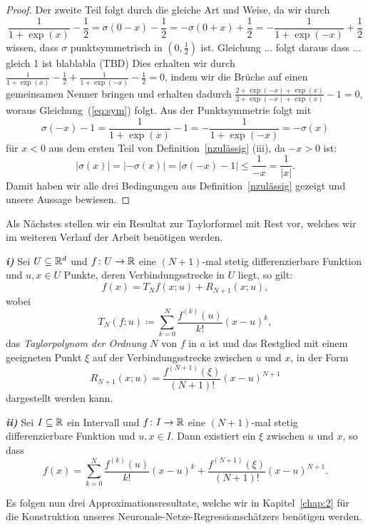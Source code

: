 \begin{proof}
Der zweite Teil folgt durch die gleiche Art und Weise, da wir durch 
\begin{equation}
\label{eq:sym}
\frac{1}{1 + \exp(x)} - \frac{1}{2}= \sigma(0 - x) - \frac{1}{2} = -\sigma(0 + x) + \frac{1}{2} = -\frac{1}{1 + \exp(-x)} + \frac{1}{2}
\end{equation}
wissen, dass $\sigma$ punktsymmetrisch in $(0, \frac{1}{2})$ ist. 
Gleichung ... folgt daraus dass ... gleich 1 ist blablabla (TBD)
Dies erhalten wir durch $\frac{1}{1 + \exp(x)} - \frac{1}{2} +\frac{1}{1 + \exp(-x)} - \frac{1}{2} = 0$, indem wir die Brüche auf einen gemeinsamen Nenner bringen und erhalten dadurch
$\frac{2 + \exp(-x) + \exp(x)}{2 + \exp(-x) + \exp(x)} - 1 = 0$, woraus  Gleichung~(\ref{eq:sym}) folgt.
Aus der Punktsymmetrie folgt mit $$\sigma(- x) - 1 = \frac{1}{1 + \exp(x)} - 1 = -\frac{1}{1 + \exp(-x)} = -\sigma(x)$$ für $x < 0$ aus dem ersten Teil von Definition~\ref{nzulässig} (iii), da $-x > 0 $ ist:  
$$|\sigma(x)| = |-\sigma(x)| = |\sigma(- x) - 1| \leq \frac{1}{-x} = \frac{1}{|x|}.$$
Damit haben wir alle drei Bedingungen aus Definition~\ref{nzulässig} gezeigt und unsere Aussage bewiesen.
\end{proof}
Als Nächstes stellen wir ein Resultat zur Taylorformel mit Rest vor, welches wir im weiteren Verlauf der Arbeit benötigen werden.

\begin{lem}
\label{lem:lagrange}

\textbf{\emph{i)}} Sei $U \subseteq \mathbb{R}^d$ und $f\colon U \to \mathbb{R}$ eine $(N + 1)$-mal stetig differenzierbare Funktion und $u, x \in U$ Punkte, deren Verbindungsstrecke in $U$ liegt, so gilt:
$$ f(x) = T_Nf(x;u) + R_{N + 1}(x;u),$$
wobei
$$
T_N(f;u) \coloneqq \sum_{k = 0}^N \frac{f^{(k)}(u)}{k!} (x - u)^k,
$$
das \emph{Taylorpolynom der Ordnung $N$} von $f$ in $a$ ist und das Restglied mit einem geeigneten Punkt $\xi$ auf der Verbindungsstrecke zwischen $u$ und $x$, in der Form 
$$ R_{N + 1}(x;u) = \frac{f^{(N + 1)}(\xi)}{(N + 1)!} (x - u)^{N + 1}$$
dargestellt werden kann.

\textbf{\emph{ii)}} Sei $I \subseteq \mathbb{R}$ ein Intervall und $f \colon I \to \mathbb{R}$ eine $(N + 1)$-mal stetig differenzierbare Funktion und $u, x \in I$. Dann existiert ein $\xi$ zwischen $u$ und $x$, so dass $$f(x) = \sum_{k = 0}^N \frac{f^{(k)}(u)}{k!}(x - u)^k + \frac{f^{(N + 1)}(\xi)}{(N + 1)!}(x - u)^{N + 1}.$$
\end{lem}
Es folgen nun drei Approximationsresultate, welche wir in Kapitel~\ref{chap:2} für die Konstruktion unseres Neuronale-Netze-Regressionschätzers benötigen werden.

